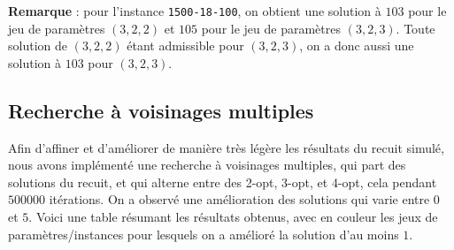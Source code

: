 \documentclass[12pt]{article}
\begin{document}
\noindent \textbf{Remarque} : pour l'instance \texttt{1500-18-100}, on obtient une solution à $103$ pour le jeu de paramètres $(3, 2, 2)$ et $105$ pour le jeu de paramètres $(3, 2, 3)$. Toute solution de $(3, 2, 2)$ étant admissible pour $(3, 2, 3)$, on a donc aussi une solution à $103$ pour $(3, 2, 3)$.

\subsection{Recherche à voisinages multiples}

Afin d'affiner et d'améliorer de manière très légère les résultats du recuit simulé, nous avons implémenté une recherche à voisinages multiples, qui part des solutions du recuit, et qui alterne entre des 2-opt, 3-opt, et 4-opt, cela pendant $500000$ itérations. On a observé une amélioration des solutions qui varie entre $0$ et $5$. Voici une table résumant les résultats obtenus, avec en couleur les jeux de paramètres/instances pour lesquels on a amélioré la solution d'au moins $1$.
\end{document}
